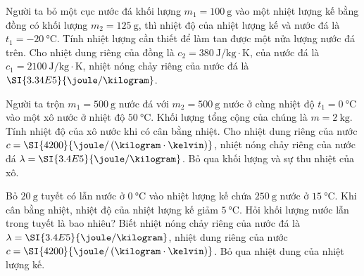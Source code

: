 \begin{ex}
		Người ta bỏ một cục nước đá khối lượng $m_1=\SI{100}{\gram}$ vào một nhiệt lượng kế bằng đồng có khối lượng $m_2=\SI{125}{\gram}$, thì nhiệt độ của nhiệt lượng kế và nước đá là $t_1=\SI{-20}{\celsius}$. Tính nhiệt lượng cần thiết để làm tan được một nửa lượng nước đá trên. Cho nhiệt dung riêng của đồng là $c_2=\SI{380}{\joule/\kilogram\cdot\kelvin}$, của nước đá là $c_1=\SI{2100}{\joule/\kilogram\cdot\kelvin}$, nhiệt nóng chảy riêng của nước đá là $\SI{3.34E5}{\joule/\kilogram}$.
\end{ex}
\begin{ex}
Người ta trộn $m_1=\SI{500}{\gram}$ nước đá với $m_2=\SI{500}{\gram}$ nước ở cùng nhiệt độ $t_1=\SI{0}{\celsius}$ vào một xô nước ở nhiệt độ $\SI{50}{\celsius}$. Khối lượng tổng cộng của chúng là $m=\SI{2}{\kilogram}$. Tính nhiệt độ của xô nước khi có cân bằng nhiệt. Cho nhiệt dung riêng của nước $c=\SI{4200}{\joule/\left(\kilogram\cdot\kelvin\right)}$, nhiệt nóng chảy riêng của nước đá $\lambda=\SI{3.4E5}{\joule/\kilogram}$. Bỏ qua khối lượng và sự thu nhiệt của xô.
\end{ex}
\begin{ex}
Bỏ $\SI{20}{\gram}$ tuyết có lẫn nước ở $\SI{0}{\celsius}$ vào nhiệt lượng kế chứa $\SI{250}{\gram}$ nước ở $\SI{15}{\celsius}$. Khi cân bằng nhiệt, nhiệt độ của nhiệt lượng kế giảm $\SI{5}{\celsius}$. Hỏi khối lượng nước lẫn trong tuyết là bao nhiêu? Biết nhiệt nóng chảy riêng của nước đá là $\lambda=\SI{3.4E5}{\joule/\kilogram}$, nhiệt dung riêng của nước $c=\SI{4200}{\joule/\left(\kilogram\cdot\kelvin\right)}$. Bỏ qua nhiệt dung của nhiệt lượng kế.
\end{ex}

